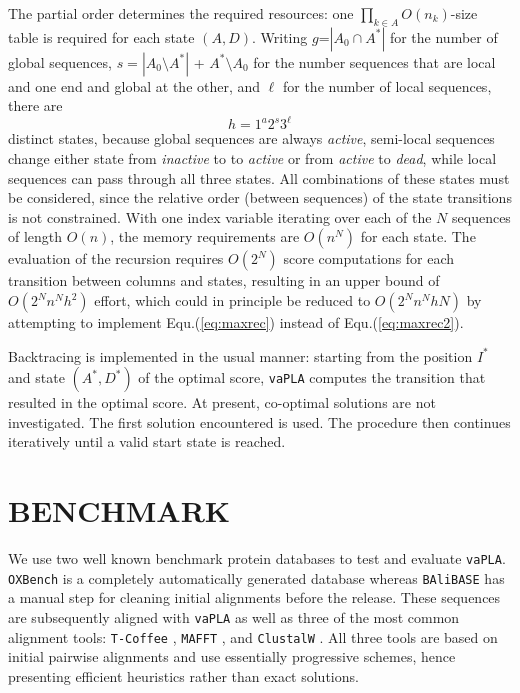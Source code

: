 \documentclass[a4paper,10pt]{article}
\let\cite\citep
\newcommand{\TODO}[1]{\begingroup\color{red}#1\endgroup}
\newcommand{\SAFTWARE}{\texttt{vaPLA}} %
\begin{document}
The partial order determines the required resources: one
$\prod_{k\in A} O(n_k)$-size table is required for each state $(A,D)$.
Writing $g$=$|A_0\cap A^*|$ for the number of global sequences,
$s=|A_0\setminus A^*|$ + $A^*\setminus A_0$ for the number sequences that
are local and one end and global at the other, and $\ell$ for the number of
local sequences, there are
\begin{equation}
  h = 1^a 2^s 3^{\ell} 
\end{equation} 
distinct states, because global sequences are always \textit{active},
semi-local sequences change either state from \textit{inactive} to to
\textit{active} or from \textit{active} to \textit{dead}, while local
sequences can pass through all three states. All combinations of these
states must be considered, since the relative order (between sequences) of
the state transitions is not constrained. With one index variable
  iterating over each of the $N$ sequences of length $O(n)$, the memory
  requirements are $O(n^N)$ for each state.  The evaluation of the
  recursion requires $O(2^N)$ score computations for each transition
  between columns and states, resulting in an upper bound of
  $O(2^N n^N h^2)$ effort, which could in principle be reduced to
  $O(2^N n^N h N)$ by attempting to implement Equ.(\ref{eq:maxrec})
  instead of Equ.(\ref{eq:maxrec2}).

Backtracing is implemented in the usual manner: starting from the
  position $I^*$ and state $(A^*,D^*)$ of the optimal score, \SAFTWARE{}
  computes the transition that resulted in the optimal score. At present,
  co-optimal solutions are not investigated. The first solution encountered
  is used. The procedure then continues iteratively until a valid start state
  is reached.

\section{\uppercase{Benchmark}}

We use two well known benchmark protein databases to test and evaluate
\SAFTWARE. \texttt{OXBench} \cite{oxbench} is a completely automatically
generated database whereas \texttt{BAliBASE} \cite{balibase} has a manual
step for cleaning initial alignments before the release. These sequences
are subsequently aligned with \SAFTWARE{} as well as three of the most
common alignment tools: \texttt{T-Coffee} \cite{Notredame:00},
\texttt{MAFFT} \cite{Katoh:05}, and \texttt{ClustalW}
\cite{Larkin:07}. All three tools are based on initial pairwise
  alignments and use essentially progressive schemes, hence presenting
  efficient heuristics rather than exact solutions.
\end{document}
